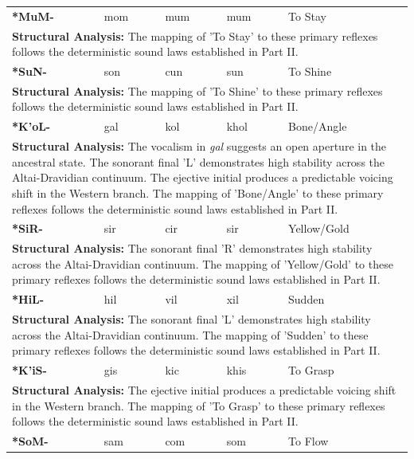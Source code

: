 \begin{longtable}{p{} p{} p{} p{} p{}}
\textbf{*MuM-} & mom & mum & mum & To Stay \\ 
\multicolumn{5}{p{\textwidth}}{\small \textbf{Structural Analysis:}  The mapping of 'To Stay' to these primary reflexes follows the deterministic sound laws established in Part II.} \\ \addlinespace[15pt] 
\textbf{*SuN-} & son & cun & sun & To Shine \\ 
\multicolumn{5}{p{\textwidth}}{\small \textbf{Structural Analysis:}  The mapping of 'To Shine' to these primary reflexes follows the deterministic sound laws established in Part II.} \\ \addlinespace[15pt] 
\textbf{*K'oL-} & gal & kol & khol & Bone/Angle \\ 
\multicolumn{5}{p{\textwidth}}{\small \textbf{Structural Analysis:} The vocalism in \textit{gal} suggests an open aperture in the ancestral state. The sonorant final 'L' demonstrates high stability across the Altai-Dravidian continuum. The ejective initial produces a predictable voicing shift in the Western branch. The mapping of 'Bone/Angle' to these primary reflexes follows the deterministic sound laws established in Part II.} \\ \addlinespace[15pt] 
\textbf{*SiR-} & sir & cir & sir & Yellow/Gold \\ 
\multicolumn{5}{p{\textwidth}}{\small \textbf{Structural Analysis:} The sonorant final 'R' demonstrates high stability across the Altai-Dravidian continuum. The mapping of 'Yellow/Gold' to these primary reflexes follows the deterministic sound laws established in Part II.} \\ \addlinespace[15pt] 
\textbf{*HiL-} & hil & vil & xil & Sudden \\ 
\multicolumn{5}{p{\textwidth}}{\small \textbf{Structural Analysis:} The sonorant final 'L' demonstrates high stability across the Altai-Dravidian continuum. The mapping of 'Sudden' to these primary reflexes follows the deterministic sound laws established in Part II.} \\ \addlinespace[15pt] 
\textbf{*K'iS-} & gis & kic & khis & To Grasp \\ 
\multicolumn{5}{p{\textwidth}}{\small \textbf{Structural Analysis:} The ejective initial produces a predictable voicing shift in the Western branch. The mapping of 'To Grasp' to these primary reflexes follows the deterministic sound laws established in Part II.} \\ \addlinespace[15pt] 
\textbf{*SoM-} & sam & com & som & To Flow \\ 

\end{longtable}

